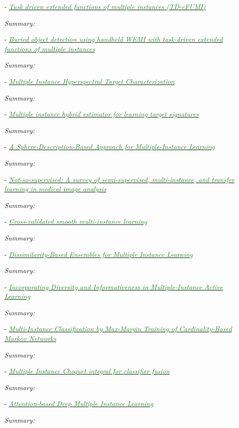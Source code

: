 \documentclass[]{article}
\newcommand{\paperentry}[4]{
            \hangindent=1cm
            \cite{#1} - \href{run:../References/#3}{\textcolor{ForestGreen}{\textit{#2}}}
            
            \noindent            
            \begin{minipage}[t]{0.1\linewidth}\hfill\end{minipage}
            \begin{minipage}[t]{0.8\linewidth}\textcolor{NavyBlue}{{\textit{Summary:}}}#4\end{minipage}
            \vspace{.25cm}
          }
\begin{document}
		\paperentry{Cook2015Thesis}
		{Task driven extended functions of multiple instances (TD-eFUMI)}
		{Multiple_Instance_Learning/Cook2015Thesis.pdf}
		{}
		
		\paperentry{Cook2016LandmineTaskDriveneFUMI}
		{Buried object detection using handheld WEMI with task-driven extended functions of multiple instances}
		{Multiple_Instance_Learning/Cook2016LandmineTaskDriveneFUMI.pdf}
		{}
		
		\paperentry{Zare2016MIACE}
		{Multiple Instance Hyperspectral Target Characterization}
		{Multiple_Instance_Learning/Zare2016MIACE.pdf}
		{}
		
		\paperentry{Jiao2017MIHE}
		{Multiple instance hybrid estimator for learning target signatures}
		{Multiple_Instance_Learning/Jiao2017MIHE.pdf}
		{}
		
		\paperentry{Xiao2017SphereMIL}
		{A Sphere-Description-Based Approach for Multiple-Instance Learning}
		{Multiple_Instance_Learning/Xiao2017SphereMIL.pdf}
		{}
		
		\paperentry{Cheplygina2019MILSurvey}
		{Not-so-supervised: A survey of semi-supervised, multi-instance, and transfer learning in medical image analysis}
		{Multiple_Instance_Learning/Cheplygina2019MILSurvey.pdf}
		{}
		
		\paperentry{Li2017SmoothMIL}
		{Cross-validated smooth multi-instance learning}
		{Multiple_Instance_Learning/Li2017SmoothMIL.pdf}
		{}
		
		\paperentry{Cheplygina2016DissimilarityEnsemblesMIL}
		{Dissimilarity-Based Ensembles for Multiple Instance Learning}
		{Multiple_Instance_Learning/Cheplygina2016DissimilarityEnsemblesMIL.pdf}
		{}
		
		\paperentry{Wang2017DiversityMILActiveLearning}
		{Incorporating Diversity and Informativeness in Multiple-Instance Active Learning}
		{Multiple_Instance_Learning/Wang2017DiversityMILActiveLearning.pdf}
		{}
		
		\paperentry{Hajimirsadeghi2017MIClassificationMarkovNetworks}
		{Multi-Instance Classification by Max-Margin Training of Cardinality-Based Markov Networks}
		{Multiple_Instance_Learning/Hajimirsadeghi2017MIClassificationMarkovNetworks.pdf}
		{}
		
		\paperentry{Du2016MIChoquetIntegralFusion}
		{Multiple Instance Choquet integral for classifier fusion}
		{Multiple_Instance_Learning/Du2016MIChoquetIntegralFusion.pdf}
		{}
		
		\paperentry{Ilse2018AttentionBasedDeepMIL}
		{Attention-based Deep Multiple Instance Learning}
		{Multiple_Instance_Learning/Ilse2018AttentionBasedDeepMIL.pdf}
		{}
		
\end{document}
